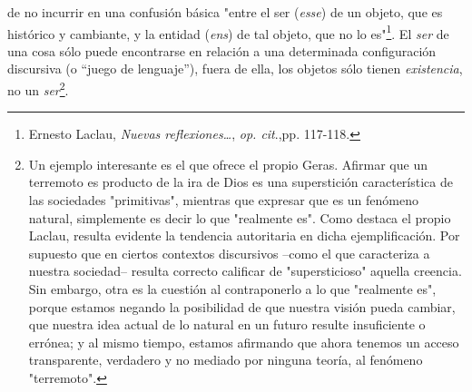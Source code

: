 \documentclass{book}
\begin{document}
de no incurrir en una confusión básica "entre el ser (\emph{esse}) de un
objeto, que es histórico y cambiante, y la entidad (\emph{ens}) de tal
objeto, que no lo es"\footnote{Ernesto Laclau, \emph{Nuevas
  reflexiones\ldots{}}, \emph{op. cit}.,pp. 117-118.}. El \emph{ser} de
una cosa sólo puede encontrarse en relación a una determinada
configuración discursiva (o ``juego de lenguaje''), fuera de ella, los
objetos sólo tienen \emph{existencia}, no un \emph{ser}\footnote{Un
  ejemplo interesante es el que ofrece el propio Geras. Afirmar que un
  terremoto es producto de la ira de Dios es una superstición
  característica de las sociedades "primitivas", mientras que expresar
  que es un fenómeno natural, simplemente es decir lo que "realmente
  es". Como destaca el propio Laclau, resulta evidente la tendencia
  autoritaria en dicha ejemplificación. Por supuesto que en ciertos
  contextos discursivos --como el que caracteriza a nuestra sociedad--
  resulta correcto calificar de "supersticioso" aquella creencia. Sin
  embargo, otra es la cuestión al contraponerlo a lo que "realmente es",
  porque estamos negando la posibilidad de que nuestra visión pueda
  cambiar, que nuestra idea actual de lo natural en un futuro resulte
  insuficiente o errónea; y al mismo tiempo, estamos afirmando que ahora
  tenemos un acceso transparente, verdadero y no mediado por ninguna
  teoría, al fenómeno "terremoto".}.
\end{document}
